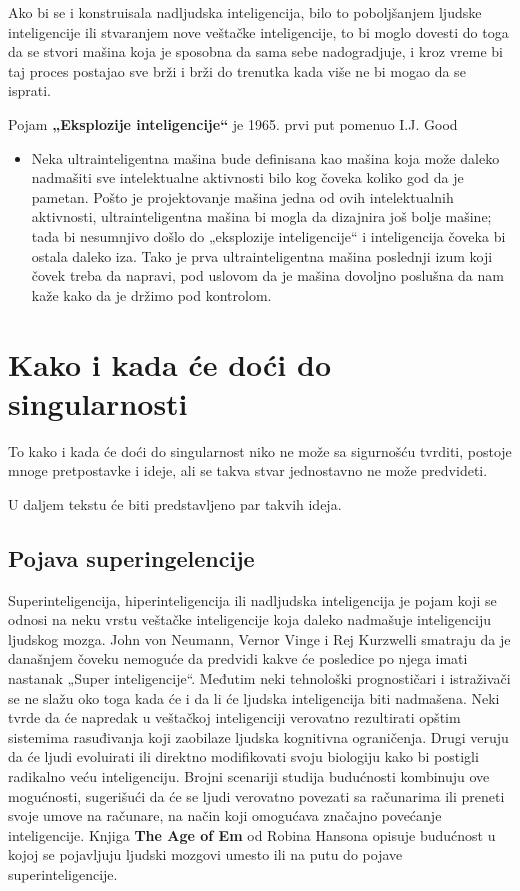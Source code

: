 \documentclass[a4paper]{article}
\begin{document}
Ako bi se i konstruisala nadljudska inteligencija, bilo to poboljšanjem ljudske inteligencije ili stvaranjem nove veštačke inteligencije, to bi moglo dovesti do toga da se stvori mašina koja je sposobna da sama sebe nadogradjuje, i kroz vreme bi taj proces postajao sve brži i brži do trenutka kada više ne bi mogao da se isprati.

Pojam \textbf{„Eksplozije inteligencije“} je 1965. prvi put pomenuo I.J. Good\cite{ref 2}

\begin{itemize}
\item Neka ultrainteligentna mašina bude definisana kao mašina koja može daleko nadmašiti sve intelektualne aktivnosti bilo kog čoveka koliko god da je pametan. Pošto je projektovanje mašina jedna od ovih intelektualnih aktivnosti, ultrainteligentna mašina bi mogla da dizajnira još bolje mašine; tada bi nesumnjivo došlo do „eksplozije inteligencije“ i inteligencija čoveka bi ostala daleko iza. Tako je prva ultrainteligentna mašina poslednji izum koji čovek treba da napravi, pod uslovom da je mašina dovoljno poslušna da nam kaže kako da je držimo pod kontrolom.
\end{itemize} 
\section{Kako i kada će doći do singularnosti}	
\label{sec:kakoikada}
To kako i kada će doći do singularnost niko ne može sa sigurnošću tvrditi, postoje mnoge pretpostavke i ideje, ali se takva stvar jednostavno ne može predvideti.

U daljem tekstu će biti predstavljeno par takvih ideja.
\subsection{Pojava superingelencije}

Superinteligencija, hiperinteligencija ili nadljudska inteligencija je pojam koji se odnosi na neku vrstu veštačke inteligencije koja daleko nadmašuje inteligenciju ljudskog mozga.  John von Neumann, Vernor Vinge i Rej Kurzwelli smatraju da je današnjem čoveku nemoguće da predvidi kakve će posledice po njega imati nastanak „Super inteligencije“.
Međutim neki tehnološki prognostičari i istraživači se ne slažu oko toga kada će i da li će ljudska inteligencija biti nadmašena.  Neki tvrde da će napredak u veštačkoj inteligenciji verovatno rezultirati opštim sistemima rasuđivanja koji zaobilaze ljudska kognitivna ograničenja. Drugi veruju da će ljudi evoluirati ili direktno modifikovati svoju biologiju kako bi postigli radikalno veću inteligenciju.\cite{ref 3}
Brojni scenariji studija budućnosti kombinuju ove mogućnosti, sugerišući da će se ljudi verovatno povezati sa računarima ili preneti svoje umove na računare, na način koji omogućava značajno povećanje inteligencije. Knjiga \textbf{The Age of Em} od Robina Hansona opisuje budućnost u kojoj se pojavljuju ljudski mozgovi umesto ili na putu do pojave superinteligencije.
\end{document}
